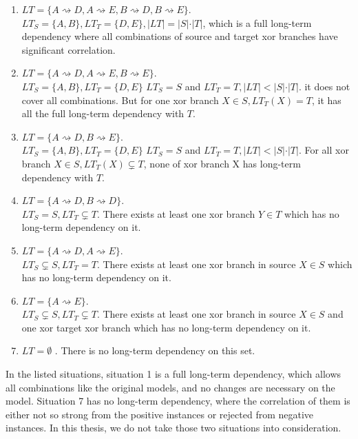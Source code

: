 \begin{enumerate}
	\item $LT=\{ A\rightsquigarrow D, A\rightsquigarrow E, B\rightsquigarrow D, B\rightsquigarrow E\}$. \\
	$LT_S = \{A,B\}, LT_T=\{D,E\}, \vert LT \vert = \vert S \vert \cdot \vert T \vert  $, which is a full long-term dependency where all combinations of source and target xor branches have significant correlation. 
	\item $LT=\{ A\rightsquigarrow D, A\rightsquigarrow E, B\rightsquigarrow E\}. $\\
	$LT_S = \{A,B\}, LT_T=\{D,E\}$
	$LT_S = S $ and $LT_T = T, \vert LT \vert < \vert S \vert \cdot \vert T \vert $. it does not cover all combinations. But for one xor branch $X \in S, LT_T(X)= T$, it has all the full long-term dependency with $T$. 
	\item $LT=\{ A\rightsquigarrow D, B\rightsquigarrow E\}. $\\
	$LT_S = \{A,B\}, LT_T=\{D,E\}$
	$LT_S = S $ and $LT_T = T, \vert LT \vert < \vert S \vert \cdot \vert T \vert $. For all xor branch $X \in S, LT_T(X) \subsetneq T$, none of xor branch X has long-term dependency with $T$.
	\item $LT=\{ A\rightsquigarrow D, B\rightsquigarrow D\}.$ \\
	$LT_S = S ,  LT_T \subsetneq T$. There exists at least one xor branch $Y \in T$ which has no long-term dependency on it.
	\item $LT=\{ A\rightsquigarrow D, A\rightsquigarrow E\}.$ \\
	$LT_S \subsetneq S ,  LT_T = T$.
	There exists at least one xor branch in source $X \in S$ which has no long-term dependency on it.
	\item $LT=\{ A\rightsquigarrow E\}. $\\
	$LT_S \subsetneq S ,  LT_T \subsetneq T$.
	There exists at least one xor branch in source $X \in S$  and one xor target xor branch which has no long-term dependency on it.
	\item $LT=\emptyset$ . There is no long-term dependency on this set. 
\end{enumerate}
In the listed situations, situation 1 is a full long-term dependency, which allows all combinations like the original models, and no changes are necessary on the model. Situation 7 has no long-term dependency, where the correlation of them is either not so strong from the positive instances or rejected from negative instances. In this thesis, we do not take those two situations into consideration.  

